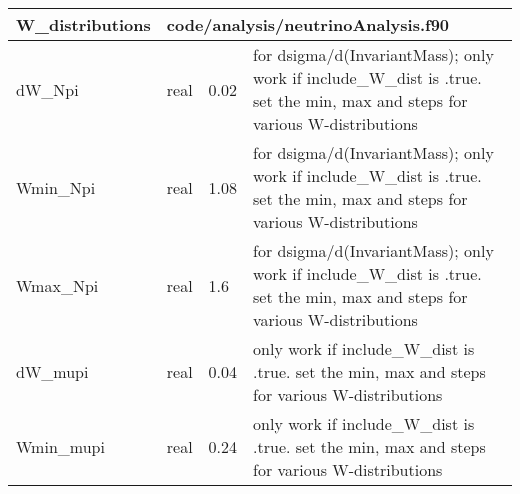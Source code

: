 \documentclass{article}
\begin{document}
\begin{longtable}{llll}
\toprule
\textbf{\large{W\_distributions}} & \multicolumn{3}{l}{\footnotesize{code/analysis/neutrinoAnalysis.f90}}\\*
\midrule
\endfirsthead
\midrule
\endhead
dW\_Npi & \begin{minipage}[t]{2cm}real\end{minipage} & \begin{minipage}[t]{2cm}0.02\end{minipage} & \begin{minipage}[t]{12cm}for dsigma/d(InvariantMass); only work if include\_W\_dist is .true. set the min, max and steps for various W-distributions\end{minipage}\\*
\midrule
Wmin\_Npi & \begin{minipage}[t]{2cm}real\end{minipage} & \begin{minipage}[t]{2cm}1.08\end{minipage} & \begin{minipage}[t]{12cm}for dsigma/d(InvariantMass); only work if include\_W\_dist is .true. set the min, max and steps for various W-distributions\end{minipage}\\*
\midrule
Wmax\_Npi & \begin{minipage}[t]{2cm}real\end{minipage} & \begin{minipage}[t]{2cm}1.6\end{minipage} & \begin{minipage}[t]{12cm}for dsigma/d(InvariantMass); only work if include\_W\_dist is .true. set the min, max and steps for various W-distributions\end{minipage}\\*
\midrule
dW\_mupi & \begin{minipage}[t]{2cm}real\end{minipage} & \begin{minipage}[t]{2cm}0.04\end{minipage} & \begin{minipage}[t]{12cm}only work if include\_W\_dist is .true. set the min, max and steps for various W-distributions\end{minipage}\\*
\midrule
Wmin\_mupi & \begin{minipage}[t]{2cm}real\end{minipage} & \begin{minipage}[t]{2cm}0.24\end{minipage} & \begin{minipage}[t]{12cm}only work if include\_W\_dist is .true. set the min, max and steps for various W-distributions\end{minipage}\\*

\end{longtable}
\end{document}

